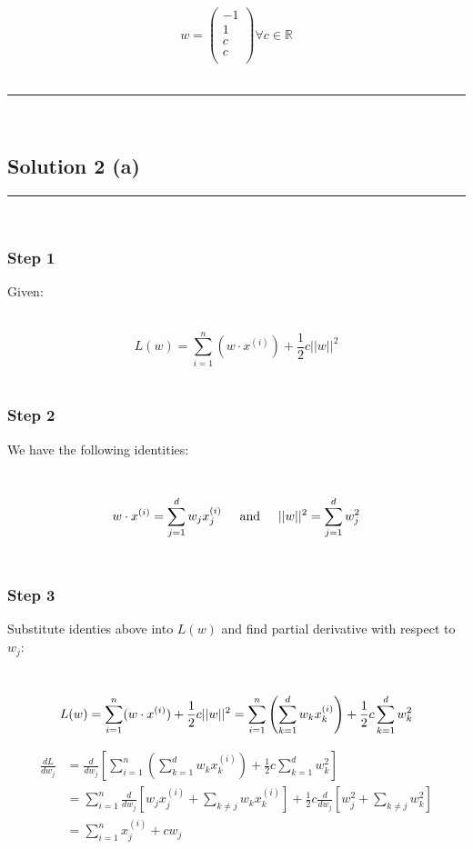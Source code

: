 \documentclass{article}
\begin{document}
$$w = \begin{pmatrix}
  -1 \\
   1 \\
   c \\
   c \\
\end{pmatrix} \forall c \in \mathbb{R}
$$\\

\noindent\rule{\textwidth}{0.4pt}\\

\newpage

\subsection*{Solution 2 (a)}
\noindent\rule{\textwidth}{0.4pt}\\

\subsubsection*{Step 1}
\parbox{\textwidth}{
Given:
}\\

$$L(w)=\sum_{i=1}^{n}(w\cdot x^{(i)})+\frac{1}{2}c||w||^{2}$$\\

\subsubsection*{Step 2}
\parbox{\textwidth}{
We have the following identities:
}\\

$$w \cdot x^{(i)} = \sum_{j=1}^{d} w_j x_j^{(i)} \hspace{0.5cm} \text{and} \hspace{0.5cm} ||w||^2 = \sum_{j=1}^{d} w_j^2$$\\

\subsubsection*{Step 3}
\parbox{\textwidth}{
Substitute identies above into $L(w)$ and find partial derivative with respect to $w_j$:
}\\

$$L(w)=\sum_{i=1}^{n}(w\cdot x^{(i)})+\frac{1}{2}c||w||^{2} = \sum_{i=1}^{n}\left(\sum_{k=1}^{d} w_k x_k^{(i)}\right)+\frac{1}{2}c\sum_{k=1}^{d} w_k^2 \\$$

\begin{align*}
  \frac{dL}{dw_j} &= \frac{d}{dw_j}\left[\sum_{i=1}^{n}\left(\sum_{k=1}^{d} w_k x_k^{(i)}\right)+\frac{1}{2}c\sum_{k=1}^{d} w_k^2\right] \\
  &= \sum_{i=1}^{n}\frac{d}{dw_j}\left[w_j x_j^{(i)} + \sum_{k \neq j} w_k x_k^{(i)}\right] + \frac{1}{2}c\frac{d}{dw_j}\left[w_j^2 + \sum_{k \neq j} w_k^2\right] \\
  &= \sum_{i=1}^{n} x_j^{(i)} + cw_j
\end{align*}
\end{document}

